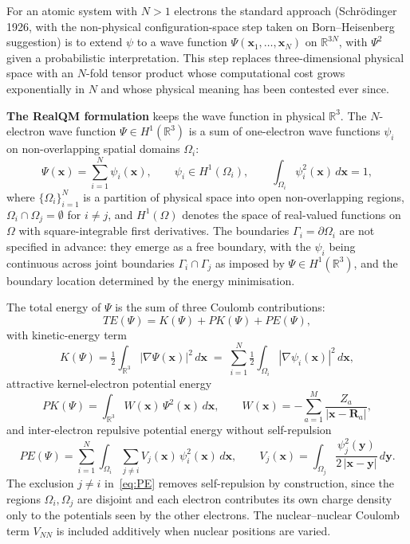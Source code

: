 \documentclass[11pt]{article}
\begin{document}
For an atomic system with $N>1$ electrons the standard approach (Schr\"odinger 1926, with the non-physical configuration-space step taken on Born--Heisenberg suggestion) is to extend $\psi$ to a wave function $\Psi(\mathbf{x}_1, \ldots, \mathbf{x}_N)$ on $\mathbb{R}^{3N}$, with $\Psi^2$ given a probabilistic interpretation. This step replaces three-dimensional physical space with an $N$-fold tensor product whose computational cost grows exponentially in $N$ and whose physical meaning has been contested ever since.

\textbf{The RealQM formulation} keeps the wave function in physical $\mathbb{R}^3$. The $N$-electron wave function $\Psi \in H^1(\mathbb{R}^3)$ is a sum of one-electron wave functions $\psi_i$ on non-overlapping spatial domains $\Omega_i$:
\begin{equation}\label{eq:Psi-sum}
\Psi(\mathbf{x}) = \sum_{i=1}^{N} \psi_i(\mathbf{x}),
\qquad
\psi_i \in H^1(\Omega_i), \qquad \int_{\Omega_i} \psi_i^2(\mathbf{x})\, d\mathbf{x} = 1,
\end{equation}
where $\{\Omega_i\}_{i=1}^{N}$ is a partition of physical space into open non-overlapping regions, $\Omega_i \cap \Omega_j = \emptyset$ for $i \ne j$, and $H^1(\Omega)$ denotes the space of real-valued functions on $\Omega$ with square-integrable first derivatives. The boundaries $\Gamma_i = \partial \Omega_i$ are not specified in advance: they emerge as a free boundary, with the $\psi_i$ being continuous across joint boundaries $\Gamma_i \cap \Gamma_j$ as imposed by $\Psi \in H^1(\mathbb{R}^3)$, and the boundary location determined by the energy minimisation.

The total energy of $\Psi$ is the sum of three Coulomb contributions:
\begin{equation}\label{eq:TE}
TE(\Psi) = K(\Psi) + PK(\Psi) + PE(\Psi),
\end{equation}
with kinetic-energy term
\begin{equation}\label{eq:K}
K(\Psi) = \tfrac{1}{2} \int_{\mathbb{R}^3} |\nabla \Psi(\mathbf{x})|^2\, d\mathbf{x}
\;=\; \sum_{i=1}^{N} \tfrac{1}{2} \int_{\Omega_i} |\nabla \psi_i(\mathbf{x})|^2\, d\mathbf{x},
\end{equation}
attractive kernel-electron potential energy
\begin{equation}\label{eq:PK}
PK(\Psi) = \int_{\mathbb{R}^3} W(\mathbf{x})\, \Psi^2(\mathbf{x})\, d\mathbf{x},
\qquad
W(\mathbf{x}) = -\sum_{a=1}^{M} \frac{Z_a}{|\mathbf{x} - \mathbf{R}_a|},
\end{equation}
and inter-electron repulsive potential energy without self-repulsion
\begin{equation}\label{eq:PE}
PE(\Psi) = \sum_{i=1}^{N} \int_{\Omega_i} \sum_{j \ne i} V_j(\mathbf{x})\, \psi_i^2(\mathbf{x})\, d\mathbf{x},
\qquad
V_j(\mathbf{x}) = \int_{\Omega_j} \frac{\psi_j^2(\mathbf{y})}{2\,|\mathbf{x} - \mathbf{y}|}\, d\mathbf{y}.
\end{equation}
The exclusion $j \ne i$ in~\eqref{eq:PE} removes self-repulsion by construction, since the regions $\Omega_i, \Omega_j$ are disjoint and each electron contributes its own charge density only to the potentials seen by the other electrons. The nuclear--nuclear Coulomb term $V_{NN}$ is included additively when nuclear positions are varied.
\end{document}
